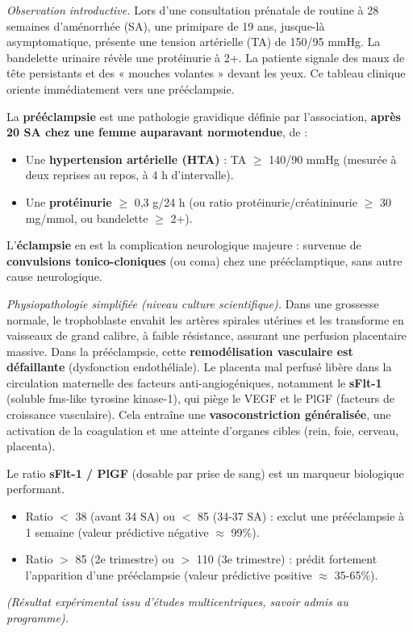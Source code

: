 \documentclass[11pt]{article}
\begin{document}
\emph{Observation introductive.} Lors d'une consultation prénatale de routine à 28 semaines d'aménorrhée (SA), une primipare de 19 ans, jusque-là asymptomatique, présente une tension artérielle (TA) de 150/95 mmHg. La bandelette urinaire révèle une protéinurie à 2+. La patiente signale des maux de tête persistants et des « mouches volantes » devant les yeux. Ce tableau clinique oriente immédiatement vers une prééclampsie.

\begin{definition}
La \textbf{prééclampsie} est une pathologie gravidique définie par l'association, \textbf{après 20 SA chez une femme auparavant normotendue}, de :
\begin{itemize}
    \item Une \textbf{hypertension artérielle (HTA)} : TA $\ge$ 140/90 mmHg (mesurée à deux reprises au repos, à 4 h d'intervalle).
    \item Une \textbf{protéinurie} $\ge$ 0,3 g/24 h (ou ratio protéinurie/créatininurie $\ge$ 30 mg/mmol, ou bandelette $\ge$ 2+).
\end{itemize}
L'\textbf{éclampsie} en est la complication neurologique majeure : survenue de \textbf{convulsions tonico-cloniques} (ou coma) chez une prééclamptique, sans autre cause neurologique.
\end{definition}

\emph{Physiopathologie simplifiée (niveau culture scientifique).} Dans une grossesse normale, le trophoblaste envahit les artères spirales utérines et les transforme en vaisseaux de grand calibre, à faible résistance, assurant une perfusion placentaire massive. Dans la prééclampsie, cette \textbf{remodélisation vasculaire est défaillante} (dysfonction endothéliale). Le placenta mal perfusé libère dans la circulation maternelle des facteurs anti-angiogéniques, notamment le \textbf{sFlt-1} (soluble fms-like tyrosine kinase-1), qui piège le VEGF et le PlGF (facteurs de croissance vasculaire). Cela entraîne une \textbf{vasoconstriction généralisée}, une activation de la coagulation et une atteinte d'organes cibles (rein, foie, cerveau, placenta).

\begin{propriete}
Le ratio \textbf{sFlt-1 / PlGF} (dosable par prise de sang) est un marqueur biologique performant.
\begin{itemize}
    \item Ratio $<$ 38 (avant 34 SA) ou $<$ 85 (34-37 SA) : exclut une prééclampsie à 1 semaine (valeur prédictive négative $\approx$ 99\%).
    \item Ratio $>$ 85 (2e trimestre) ou $>$ 110 (3e trimestre) : prédit fortement l'apparition d'une prééclampsie (valeur prédictive positive $\approx$ 35-65\%).
\end{itemize}
\emph{(Résultat expérimental issu d'études multicentriques, savoir admis au programme).}
\end{propriete}
\end{document}
